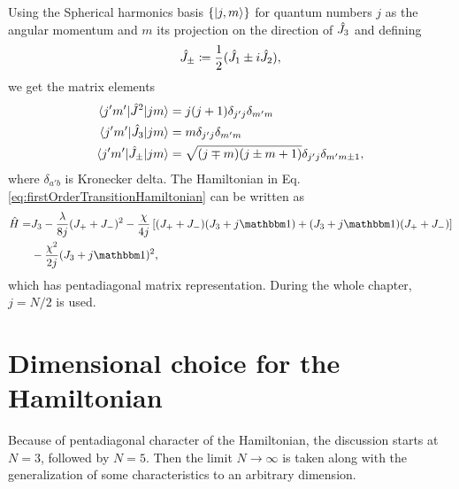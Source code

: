 Using the Spherical harmonics basis $\{\ket{j,m}\}$ for quantum numbers $j$ as the angular momentum and $m$ its projection on the direction of $\hat{J}_3$ and defining
\begin{equation}
    \hat{J}_\pm\coloneqq\frac{1}{2}(\hat{J}_1\pm i\hat{J}_2),
\end{equation}
we get the matrix elements
\begin{align}
    \braket{j'm'|\hat{J}^2|jm} &= j(j+1)\delta_{j'j}\delta_{m'm}\\
    \braket{j'm'|\hat{J}_3|jm} &= m \delta_{j'j}\delta_{m'm}\\
    \braket{j'm'|\hat{J}_\pm|jm} &= \sqrt{(j\mp m)(j\pm m+1)}\delta_{j'j}\delta_{m'm\pm 1},
\end{align}
where $\delta_{a'b}$ is Kronecker delta. The Hamiltonian in Eq. \ref{eq:firstOrderTransitionHamiltonian} can be written as
\begin{equation}
\begin{split}
        \HH =& J_3-\frac{\lambda}{8j}(J_++J_-)^2-\frac{\chi}{4j}\left[(J_++J_-)(J_3+j\Id)+(J_3+j\Id)(J_++J_-)\right]\\
        &-\frac{\chi^2}{2j}(J_3+j\Id)^2,
\end{split}
\end{equation}
which has pentadiagonal matrix representation. During the whole chapter, $j=N/2$ is used. 











\section{Dimensional choice for the Hamiltonian}
Because of pentadiagonal character of the Hamiltonian, the discussion starts at $N=3$, followed by $N=5$. Then the limit $N\rightarrow\infty$ is taken along with the generalization of some characteristics to an arbitrary dimension. 

